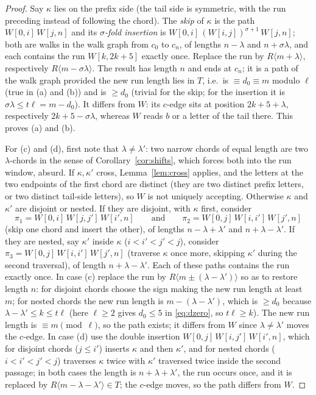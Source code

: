 \documentclass[11pt]{article}
\theoremstyle{definition}
\begin{document}
\begin{proof}
Say $\kappa$ lies on the prefix side (the tail side is symmetric, with the
run preceding instead of following the chord). The \emph{skip} of $\kappa$ is
the path $W[0,i]\,W[j,n]$ and its \emph{$\sigma$-fold insertion} is
$W[0,i]\,(W[i,j])^{\sigma+1}\,W[j,n]$; both are walks in the walk graph from
$c_0$ to $c_n$, of lengths $n-\lambda$ and $n+\sigma\lambda$, and each
contains the run $W[k,2k+5]$ exactly once. Replace the run by
$R\langle m+\lambda\rangle$, respectively $R\langle m-\sigma\lambda\rangle$.
The result has length $n$ and ends at $c_n$; it is a path of the walk graph
provided the new run length lies in $T$, i.e.\ is $\equiv d_0\equiv m$ modulo
$\ell$ (true in (a) and (b)) and is $\ge d_0$ (trivial for the skip; for the
insertion it is $\sigma\lambda\le t\ell=m-d_0$). It differs from $W$: its
$c$-edge sits at position $2k+5+\lambda$, respectively $2k+5-\sigma\lambda$,
whereas $W$ reads $b$ or a letter of the tail there. This proves (a) and (b).

For (c) and (d), first note that $\lambda\ne\lambda'$: two narrow chords of
equal length are two $\lambda$-chords in the sense of
Corollary~\ref{cor:shifts}, which forces both into the run window, absurd.
If $\kappa,\kappa'$ cross, Lemma~\ref{lem:cross} applies, and the letters at
the two endpoints of the first chord are distinct (they are two distinct
prefix letters, or two distinct tail-side letters), so $W$ is not uniquely
accepting. Otherwise $\kappa$ and $\kappa'$ are disjoint or nested. If they
are disjoint, with $\kappa$ first, consider
\[
\pi_1=W[0,i]\,W[j,j']\,W[i',n]\qquad\text{and}\qquad
\pi_2=W[0,j]\,W[i,i']\,W[j',n]
\]
(skip one chord and insert the other), of lengths $n-\lambda+\lambda'$ and
$n+\lambda-\lambda'$. If they are nested, say $\kappa'$ inside $\kappa$
($i<i'<j'<j$), consider $\pi_3=W[0,j]\,W[i,i']\,W[j',n]$ (traverse $\kappa$
once more, skipping $\kappa'$ during the second traversal), of length
$n+\lambda-\lambda'$. Each of these paths contains the run exactly once. In
case (c) replace the run by $R\langle m\pm(\lambda-\lambda')\rangle$ so as to
restore length $n$: for disjoint chords choose the sign making the new run
length at least $m$; for nested chords the new run length is
$m-(\lambda-\lambda')$, which is $\ge d_0$ because $\lambda-\lambda'\le k\le
t\ell$ (here $\ell\ge2$ gives $d_0\le5$ in \eqref{eq:dzero}, so $t\ell\ge k$).
The new run length is $\equiv m\pmod\ell$, so the path exists; it differs
from $W$ since $\lambda\ne\lambda'$ moves the $c$-edge. In case (d) use the
double insertion $W[0,j]\,W[i,j']\,W[i',n]$, which for disjoint chords
($j\le i'$) inserts $\kappa$ and then $\kappa'$, and for nested chords
($i<i'<j'<j$) traverses $\kappa$ twice with $\kappa'$ traversed twice inside
the second passage; in both cases the length is $n+\lambda+\lambda'$, the run
occurs once, and it is replaced by $R\langle m-\lambda-\lambda'\rangle\in T$;
the $c$-edge moves, so the path differs from $W$.
\end{proof}
\end{document}
